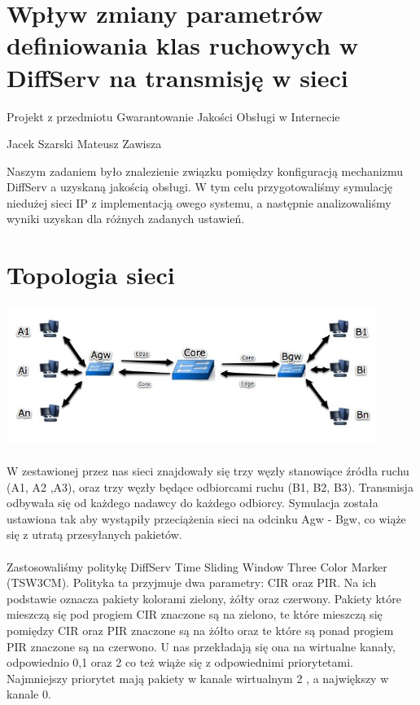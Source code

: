 \documentclass[a4paper]{article}
\begin{document}
\section{Wpływ zmiany parametrów definiowania klas ruchowych w DiffServ na transmisję w sieci}

Projekt z przedmiotu Gwarantowanie Jakości Obsługi w Internecie

Jacek Szarski
Mateusz Zawisza


Naszym zadaniem było znalezienie związku pomiędzy konfiguracją mechanizmu DiffServ a uzyskaną jakością obsługi. W tym celu przygotowaliśmy symulację niedużej sieci IP z implementacją owego systemu, a następnie analizowaliśmy wyniki uzyskan dla różnych zadanych ustawień.


\section{Topologia sieci}

\includegraphics[width=120mm]{images/topologia.jpeg}

\paragraph{}
W zestawionej przez nas sieci znajdowały się trzy węzły stanowiące źródła ruchu (A1, A2 ,A3), oraz trzy węzły będące odbiorcami ruchu (B1, B2, B3). Transmisja odbywała się od każdego nadawcy do każdego odbiorcy. Symulacja została ustawiona tak aby wystąpiły przeciążenia sieci na odcinku Agw - Bgw, co wiąże się z utratą przesyłanych pakietów.

\paragraph{}
Zastosowaliśmy politykę DiffServ Time Sliding Window Three Color Marker (TSW3CM).
Polityka ta przyjmuje dwa parametry: CIR oraz PIR. Na ich podstawie oznacza pakiety kolorami zielony, żółty oraz czerwony. Pakiety które mieszczą się pod progiem CIR znaczone są na zielono, te które mieszczą się pomiędzy CIR oraz PIR znaczone są na żółto oraz te które są ponad progiem PIR znaczone są na czerwono. U nas przekładają się ona na wirtualne kanały, odpowiednio 0,1 oraz 2 co też wiąże się z odpowiednimi priorytetami. Najmniejszy priorytet mają pakiety w kanale wirtualnym 2 , a największy w kanale 0.
\end{document}

